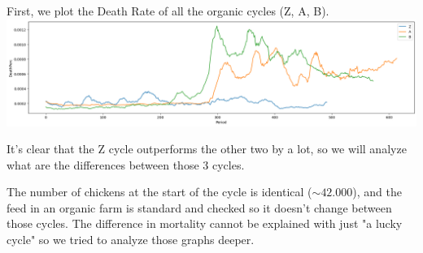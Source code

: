 \documentclass[11pt]{article}
\begin{document}
First, we plot the Death Rate of all the organic cycles (Z, A, B).\newline
\includegraphics[width=\linewidth]{../Results/Comparison_Z_AB/Death.png}

It's clear that the Z cycle outperforms the other two by a lot, so we will analyze what are the differences between those 3 cycles.

The number of chickens at the start of the cycle is identical ($\sim 42.000$), and the feed in an organic farm is standard and checked so it doesn't change between those cycles.
The difference in mortality cannot be explained with just "a lucky cycle" so we tried to analyze those graphs deeper.
\end{document}
